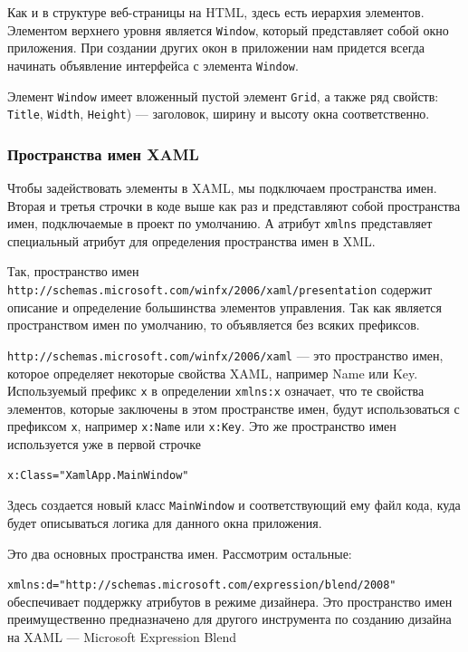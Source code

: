 Как и в структуре веб-страницы на HTML, здесь есть иерархия элементов. Элементом верхнего уровня является \texttt{Window}, который представляет собой окно приложения. При создании других окон в приложении нам придется всегда начинать объявление интерфейса с элемента \texttt{Window}.

Элемент \texttt{Window} имеет вложенный пустой элемент \texttt{Grid}, а также ряд свойств: \texttt{Title}, \texttt{Width}, \texttt{Height}) — заголовок, ширину и высоту окна соответственно.

\subsubsection{Пространства имен XAML}

Чтобы задействовать элементы в XAML, мы подключаем пространства имен. Вторая и третья строчки в коде выше как раз и представляют собой пространства имен, подключаемые в проект по умолчанию. А атрибут \texttt{xmlns} представляет специальный атрибут для определения пространства имен в XML.

Так, пространство имен \texttt{http://schemas.microsoft.com/winfx/2006/xaml/presentation} содержит описание и определение большинства элементов управления. Так как является пространством имен по умолчанию, то объявляется без всяких префиксов.

\texttt{http://schemas.microsoft.com/winfx/2006/xaml} — это пространство имен, которое определяет некоторые свойства XAML, например Name или Key. Используемый префикс \texttt{x} в определении \texttt{xmlns:x} означает, что те свойства элементов, которые заключены в этом пространстве имен, будут использоваться с префиксом \texttt{x}, например \texttt{x:Name} или \texttt{x:Key}. Это же пространство имен используется уже в первой строчке 

\begin{verbatim}
x:Class="XamlApp.MainWindow"
\end{verbatim}

Здесь создается новый класс \texttt{MainWindow} и соответствующий ему файл кода, куда будет описываться логика для данного окна приложения.

Это два основных пространства имен. Рассмотрим остальные:

\texttt{xmlns:d="http://schemas.microsoft.com/expression/blend/2008"} обеспечивает поддержку атрибутов в режиме дизайнера. Это пространство имен преимущественно предназначено для другого инструмента по созданию дизайна на XAML — Microsoft Expression Blend

